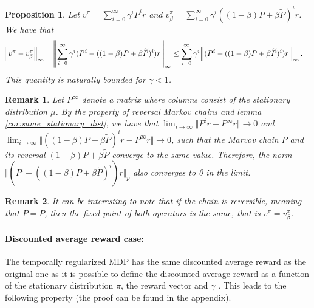 \documentclass{article}
\newtheorem{proposition}{Proposition}
\newtheorem*{remark}{Remark}
\newcommand{\param}{\beta}
\newcommand{\pol}{\pi}
\begin{document}

\begin{proposition}
Let $v^{\pol} = \sum_{i=0}^{\infty} \gamma^i P^i r$ and $v^{\pol}_{\param} = \sum_{i=0}^{\infty} \gamma^i ((1-\param) P + \param \widetilde{P})^i r$. We have that
\begin{equation}
    \begin{split}
        \norm{v^{\pol} - v^{\pol}_{\param}}_{\infty} &= \norm{\sum_{i=0}^{\infty} \gamma^i (P^i-((1-\param) P + \param \widetilde{P})^i) r}_{\infty}
        \leq \sum_{i=0}^{\infty} \gamma^i \norm{ (P^i-((1-\param) P + \param \widetilde{P})^i) r}_{\infty}.
    \end{split}
\end{equation}
This quantity is naturally bounded for $\gamma < 1$.
\end{proposition}
\begin{remark}
Let $P^\infty$ denote a matrix where columns consist of the stationary distribution $\mu$.
By the property of reversal Markov chains and lemma \ref{cor:same_stationary_dist}, we have that $\lim_{i\rightarrow\infty} \Vert P^i r-P^\infty r \Vert \rightarrow 0$ and $\lim_{i\rightarrow\infty} \Vert ((1-\param)P+\param \widetilde{P})^i r-P^\infty r \Vert \rightarrow 0$, such that the Marvov chain $P$ and its reversal $(1-\param)P+\param \widetilde{P}$ converge to the same value. Therefore, the norm $\Vert  (P^i-((1-\param) P + \param \widetilde{P})^i) r \Vert_p$ also converges to 0 in the limit.
\end{remark}

\begin{remark}
It can be interesting to note that if the chain is reversible, meaning that $P = \widetilde{P}$, then the fixed point of both operators is the same, that is $v^\pol = v_\param^\pol$.
\end{remark}

\paragraph{Discounted average reward case:} The temporally regularized MDP has the same discounted average reward as the original one as it is possible to define the discounted average reward \citep{tsitsiklis2002average} as a function of the stationary distribution $\pi$, the reward vector and $\gamma$ . This leads to the following property (the proof can be found in the appendix).
\end{document}
